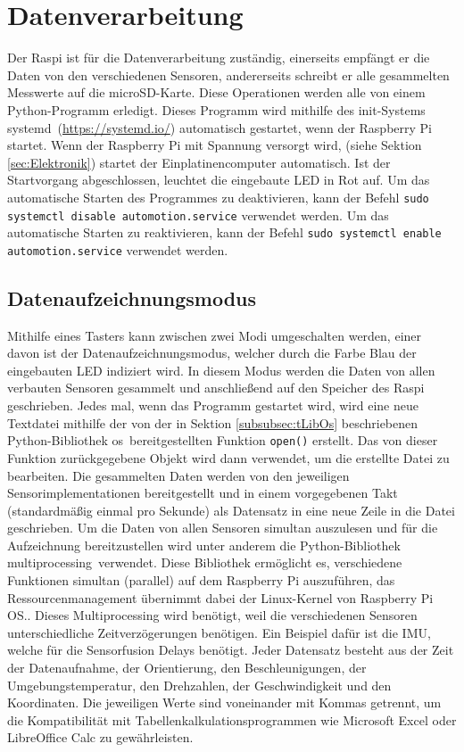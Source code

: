 \section{Datenverarbeitung}
\label{sec:Datenverarbeitung}
Der \ac{Raspi} ist für die Datenverarbeitung zuständig, einerseits empfängt er die Daten von den verschiedenen Sensoren, andererseits schreibt er alle gesammelten Messwerte auf die microSD-Karte. Diese Operationen werden alle von einem Python-Programm erledigt. Dieses Programm wird mithilfe des init-Systems \glqq systemd\grqq\ (\url{https://systemd.io/}) automatisch gestartet, wenn der Raspberry Pi startet. Wenn der Raspberry Pi mit Spannung versorgt wird, (siehe Sektion \ref{sec:Elektronik}) startet der Einplatinencomputer automatisch. Ist der Startvorgang abgeschlossen, leuchtet die eingebaute \ac{LED} in Rot auf. Um das automatische Starten des Programmes zu deaktivieren, kann der Befehl \verb|sudo systemctl disable automotion.service| verwendet werden. Um das automatische Starten zu reaktivieren, kann der Befehl \verb|sudo systemctl enable automotion.service| verwendet werden.
\subsection{Datenaufzeichnungsmodus}
\label{subsec:Datenaufzeichnungsmodus}
Mithilfe eines Tasters kann zwischen zwei Modi umgeschalten werden, einer davon ist der Datenaufzeichnungsmodus, welcher durch die Farbe Blau der eingebauten \ac{LED} indiziert wird. In diesem Modus werden die Daten von allen verbauten Sensoren gesammelt und anschließend auf den Speicher des \ac{Raspi} geschrieben. Jedes mal, wenn das Programm gestartet wird, wird eine neue Textdatei mithilfe der von der in Sektion \ref{subsubsec:tLibOs} beschriebenen Python-Bibliothek \glqq os\grqq\ bereitgestellten Funktion \verb|open()| erstellt. Das von dieser Funktion zurückgegebene Objekt wird dann verwendet, um die erstellte Datei zu bearbeiten. Die gesammelten Daten werden von den jeweiligen Sensorimplementationen bereitgestellt und in einem vorgegebenen Takt (standardmäßig einmal pro Sekunde) als Datensatz in eine neue Zeile in die Datei geschrieben. Um die Daten von allen Sensoren simultan auszulesen und für die Aufzeichnung bereitzustellen wird unter anderem die Python-Bibliothek \glqq multiprocessing\grqq\ verwendet. Diese Bibliothek ermöglicht es, verschiedene Funktionen simultan (parallel) auf dem Raspberry Pi auszuführen, das Ressourcenmanagement übernimmt dabei der Linux-Kernel von Raspberry Pi OS.. Dieses Multiprocessing wird benötigt, weil die verschiedenen Sensoren unterschiedliche Zeitverzögerungen benötigen. Ein Beispiel dafür ist die \ac{IMU}, welche für die Sensorfusion Delays benötigt. Jeder Datensatz besteht aus der Zeit der Datenaufnahme, der Orientierung, den Beschleunigungen, der Umgebungstemperatur, den Drehzahlen, der Geschwindigkeit und den Koordinaten. Die jeweiligen Werte sind voneinander mit Kommas getrennt, um die Kompatibilität mit Tabellenkalkulationsprogrammen wie Microsoft Excel oder LibreOffice Calc zu gewährleisten.
